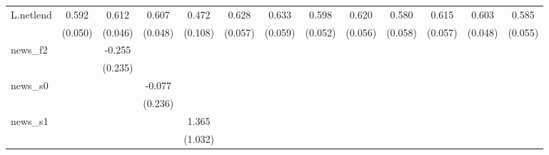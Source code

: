 {\begin{tabular}{l*{12}{c}}
\addlinespace
L.netlend   &       0.592\sym{***}&       0.612\sym{***}&       0.607\sym{***}&       0.472\sym{***}&       0.628\sym{***}&       0.633\sym{***}&       0.598\sym{***}&       0.620\sym{***}&       0.580\sym{***}&       0.615\sym{***}&       0.603\sym{***}&       0.585\sym{***}\\
            &     (0.050)         &     (0.046)         &     (0.048)         &     (0.108)         &     (0.057)         &     (0.059)         &     (0.052)         &     (0.056)         &     (0.058)         &     (0.057)         &     (0.048)         &     (0.055)         \\
\addlinespace
news\_f2     &                     &      -0.255         &                     &                     &                     &                     &                     &                     &                     &                     &                     &                     \\
            &                     &     (0.235)         &                     &                     &                     &                     &                     &                     &                     &                     &                     &                     \\
\addlinespace
news\_s0     &                     &                     &      -0.077         &                     &                     &                     &                     &                     &                     &                     &                     &                     \\
            &                     &                     &     (0.236)         &                     &                     &                     &                     &                     &                     &                     &                     &                     \\
\addlinespace
news\_s1     &                     &                     &                     &       1.365         &                     &                     &                     &                     &                     &                     &                     &                     \\
            &                     &                     &                     &     (1.032)         &                     &                     &                     &                     &                     &                     &                     &                     \\

\end{tabular}}
